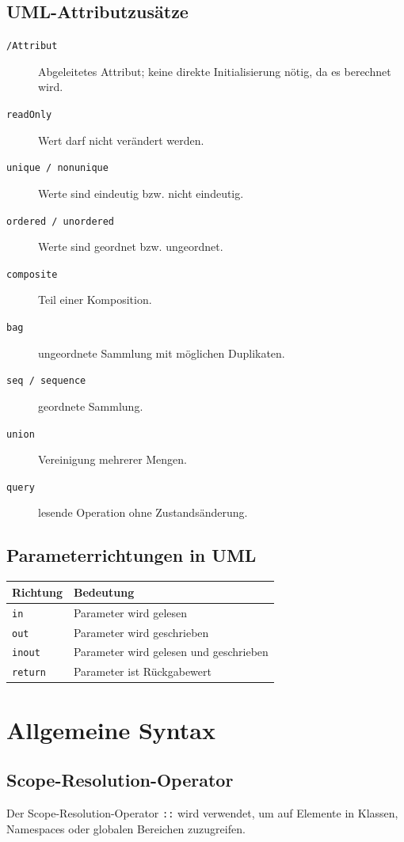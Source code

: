 \documentclass[11pt,a4paper]{article}
\newcommand{\code}[1]{\texttt{#1}}
\begin{document}
\subsection{UML-Attributzusätze}
\begin{description}
  \item[\code{/Attribut}] Abgeleitetes Attribut; keine direkte Initialisierung nötig, da es berechnet wird.
  \item[\code{readOnly}] Wert darf nicht verändert werden.
  \item[\code{unique / nonunique}] Werte sind eindeutig bzw. nicht eindeutig.
  \item[\code{ordered / unordered}] Werte sind geordnet bzw. ungeordnet.
  \item[\code{composite}] Teil einer Komposition.
  \item[\code{bag}] ungeordnete Sammlung mit möglichen Duplikaten.
  \item[\code{seq / sequence}] geordnete Sammlung.
  \item[\code{union}] Vereinigung mehrerer Mengen.
  \item[\code{query}] lesende Operation ohne Zustandsänderung.
\end{description}

\subsection{Parameterrichtungen in UML}
\begin{center}
\begin{tabular}{ll}
\toprule
Richtung & Bedeutung \\
\midrule
\code{in} & Parameter wird gelesen \\
\code{out} & Parameter wird geschrieben \\
\code{inout} & Parameter wird gelesen und geschrieben \\
\code{return} & Parameter ist Rückgabewert \\
\bottomrule
\end{tabular}
\end{center}

\section{Allgemeine Syntax}

\subsection{Scope-Resolution-Operator}
Der Scope-Resolution-Operator \code{::} wird verwendet, um auf Elemente in Klassen, Namespaces oder globalen Bereichen zuzugreifen.
\end{document}
